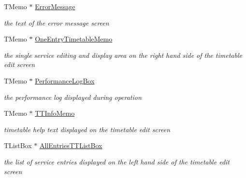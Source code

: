 \begin{DoxyCompactItemize}
T\+Memo $\ast$ \mbox{\hyperlink{class_t_interface_a119ec238c21ed011f11764d77c6c20b6}{Error\+Message}}
\begin{DoxyCompactList}\small\item\em the text of the error message screen \end{DoxyCompactList}\item 
\mbox{\label{class_t_interface_ad3adbf556bff0b01b12be33a595373fb}} 
T\+Memo $\ast$ \mbox{\hyperlink{class_t_interface_ad3adbf556bff0b01b12be33a595373fb}{One\+Entry\+Timetable\+Memo}}
\begin{DoxyCompactList}\small\item\em the single service editing and display area on the right hand side of the timetable edit screen \end{DoxyCompactList}\item 
\mbox{\label{class_t_interface_a76addd0eae1d81ecc29d7109aa1da54c}} 
T\+Memo $\ast$ \mbox{\hyperlink{class_t_interface_a76addd0eae1d81ecc29d7109aa1da54c}{Performance\+Log\+Box}}
\begin{DoxyCompactList}\small\item\em the performance log displayed during operation \end{DoxyCompactList}\item 
\mbox{\label{class_t_interface_a5f4cdf54d45ef2756fbcc7c1faeb7751}} 
T\+Memo $\ast$ \mbox{\hyperlink{class_t_interface_a5f4cdf54d45ef2756fbcc7c1faeb7751}{T\+T\+Info\+Memo}}
\begin{DoxyCompactList}\small\item\em timetable help text displayed on the timetable edit screen \end{DoxyCompactList}\item 
\mbox{\label{class_t_interface_a2186c4827761360ddb9bccc3d8ef4295}} 
T\+List\+Box $\ast$ \mbox{\hyperlink{class_t_interface_a2186c4827761360ddb9bccc3d8ef4295}{All\+Entries\+T\+T\+List\+Box}}
\begin{DoxyCompactList}\small\item\em the list of service entries displayed on the left hand side of the timetable edit screen \end{DoxyCompactList}\item 
\mbox{\label{class_t_interface_a06c02506913fc9d0fe5f13c4950ff99f}} 

\end{DoxyCompactItemize}
